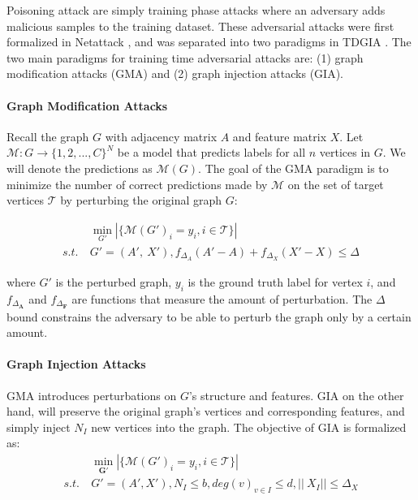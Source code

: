 \documentclass{article}
\begin{document}
Poisoning attack are simply training phase attacks where an adversary adds malicious samples to the training dataset. These adversarial attacks were first formalized in Netattack \cite{netattack}, and was separated into two paradigms in TDGIA \cite{TDGIA}. The two main paradigms for training time adversarial attacks are: (1) graph modification attacks (GMA) and (2) graph injection attacks (GIA). 

\paragraph{Graph Modification Attacks}

Recall the graph $G$ with adjacency matrix $A$ and feature matrix $X$. Let $\mathcal{M}:G\rightarrow \{1,2,...,C\}^N$ be a model that predicts labels for all $n$ vertices in $G$. We will denote the predictions as $\mathcal{M}(G)$. The goal of the GMA paradigm is to minimize the number of correct predictions made by $\mathcal{M}$ on the set of target vertices $\mathcal{T}$ by perturbing the original graph $G$:

\begin{equation}
\label{GMA}
\begin{split}
& \min_{G'}|\{\mathcal{M}(G')_i=y_i, i\in\mathcal{T}\}| \\
s.t.\ & G'=(A', \ X'),f_{\Delta_{A}}(A'-A)+f_{\Delta_{X}}(X'-X)\leq\Delta
\end{split}    
\end{equation}

where $G'$ is the perturbed graph, $y_i$ is the ground truth label for vertex $i$, and $f_{\Delta_{\mathbf{A}}}$ and $f_{\Delta_{\mathbf{F}}}$ are functions that measure the amount of perturbation. The $\Delta$ bound constrains the adversary to be able to perturb the graph only by a certain amount. 

\paragraph{Graph Injection Attacks}
GMA introduces perturbations on $G$'s structure and features. GIA on the other hand, will preserve the original graph's vertices and corresponding features, and simply inject $N_I$ new vertices into the graph. The objective of GIA is formalized as:
\begin{equation}
\label{GIA}
\begin{split}
& \min_{\mathbf{G}'} |\{\mathcal{M}(G')_i=y_i, i\in\mathcal{T}\}| \\
s.t.\ & G'=(A',X'), N_I \leq b, deg(v)_{v\in I}\leq d, ||\ X_I||\leq \Delta_X
\end{split}
\end{equation}
\end{document}
